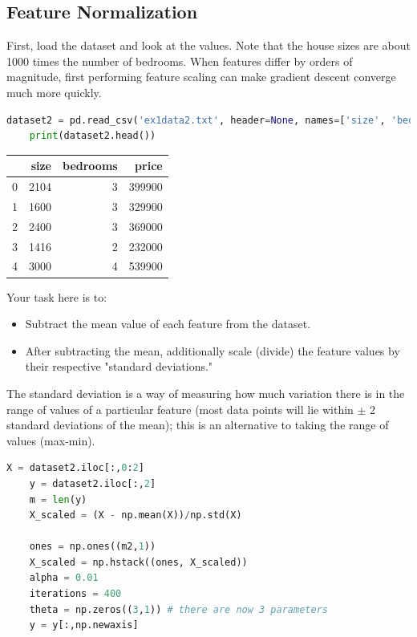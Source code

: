 \documentclass[12pt]{article}
\begin{document}
\subsection{Feature Normalization}
First, load the dataset and look at the values. Note that the house sizes are about 1000 times the number of bedrooms. When features differ by orders of magnitude, first performing feature scaling can make gradient descent converge much more quickly.

\begin{lstlisting}[language = Python]
    dataset2 = pd.read_csv('ex1data2.txt', header=None, names=['size', 'bedrooms', 'price'])
    print(dataset2.head())
\end{lstlisting}

\begin{table}[h!]
  \centering
  \begin{tabular}{ r r r r } 
     & size & bedrooms & price \\
    \hline
    0 & 2104 & 3 & 399900 \\
    1 & 1600 & 3 & 329900 \\
    2 & 2400 & 3 & 369000 \\
    3 & 1416 & 2 & 232000 \\
    4 & 3000 & 4 & 539900 \\
    \hline
  \end{tabular}
\end{table}

Your task here is to:
\begin{itemize}
  \item Subtract the mean value of each feature from the dataset.
  \item After subtracting the mean, additionally scale (divide) the feature values by their respective "standard deviations."
\end{itemize}

The standard deviation is a way of measuring how much variation there is in the range of values of a particular feature (most data points will lie within $\pm$ 2 standard deviations of the mean); this is an alternative to taking the range of values (max-min).

\begin{lstlisting}[language=Python]
    X = dataset2.iloc[:,0:2] 
    y = dataset2.iloc[:,2]
    m = len(y)
    X_scaled = (X - np.mean(X))/np.std(X)

    ones = np.ones((m2,1))
    X_scaled = np.hstack((ones, X_scaled))
    alpha = 0.01
    iterations = 400
    theta = np.zeros((3,1)) # there are now 3 parameters
    y = y[:,np.newaxis]
\end{lstlisting}
\end{document}
